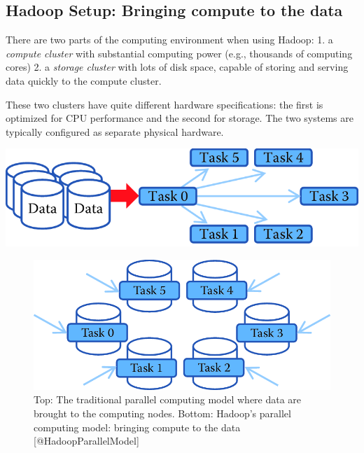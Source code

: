 \documentclass[]{krantz}
\begin{document}
\subsection{Hadoop Setup: Bringing compute to the
data}\label{hadoop-setup-bringing-compute-to-the-data}

There are two parts of the computing environment when using Hadoop: 1. a
\emph{compute cluster} with substantial computing power (e.g., thousands
of computing cores) 2. a \emph{storage cluster} with lots of disk space,
capable of storing and serving data quickly to the compute cluster.

These two clusters have quite different hardware specifications: the
first is optimized for CPU performance and the second for storage. The
two systems are typically configured as separate physical hardware.

\begin{center}\includegraphics[width=0.7\linewidth]{ChapterParallel/figures/data2compute} \end{center}

\begin{figure}

{\centering \includegraphics[width=0.7\linewidth]{ChapterParallel/figures/compute2data} 

}

\caption{Top: The traditional parallel computing model where data are brought to the computing nodes. Bottom: Hadoop’s parallel computing model: bringing compute to the data [@HadoopParallelModel]}\label{fig:fig5-1a}
\end{figure}
\end{document}
